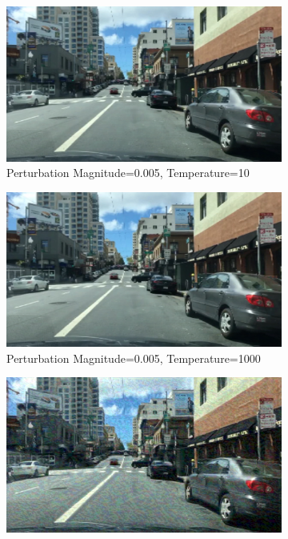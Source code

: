     \begin{figure}
    	\centering
    	\label{fig:pr_basic}
    	\begin{subfigure}[t]{0.485\textwidth}
    		\centering
    		\includegraphics[width=\textwidth]{images/ODIN/image_0.005_10.png}

    		\caption{Perturbation Magnitude=0.005, Temperature=10}
    	\end{subfigure}
    	\begin{subfigure}[t]{0.485\textwidth}
    		\centering
    		\includegraphics[width=\textwidth]{images/ODIN/image_0.005_1000.png}

    		\caption{Perturbation Magnitude=0.005, Temperature=1000}
    	\end{subfigure}
    
    	\begin{subfigure}[t]{0.485\textwidth}
    		\centering
    		\includegraphics[width=\textwidth]{images/ODIN/image_0.05_10.png}


\end{subfigure}
\end{figure}

